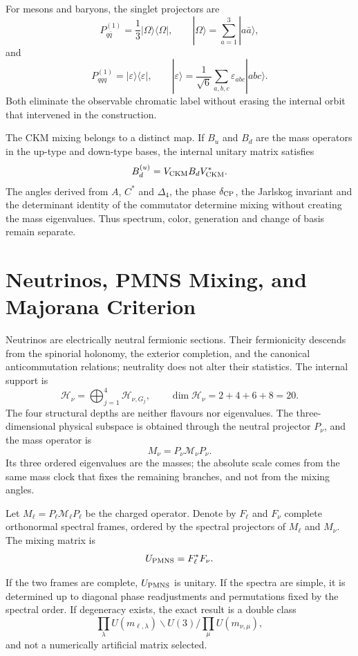 For mesons and baryons, the singlet projectors are
\[
 P_{q\bar q}^{(1)}
 =\frac1{3}|\Omega\rangle\langle\Omega|,
 \qquad
 |\Omega\rangle=\sum_{a=1}^{3}|a\bar a\rangle,
\]
and
\[
 P_{qqq}^{(1)}
 =|\varepsilon\rangle\langle\varepsilon|,
 \qquad
 |\varepsilon\rangle
 =\frac1{\sqrt6}\sum_{a,b,c}\varepsilon_{abc}|abc\rangle.
\]
Both eliminate the observable chromatic label without erasing the internal orbit
that intervened in the construction.

The CKM mixing belongs to a distinct map. If \(B_u\) and \(B_d\) are the
mass operators in the up-type and down-type bases, the internal unitary matrix
satisfies
\[
 B_d^{(u)}=V_{\rm CKM} B_d V_{\rm CKM}^*.
\]
The angles derived from \(A\), \(C^*\) and \(\Delta_4\), the phase
\(\delta_{\rm CP}\), the Jarlskog invariant and the determinant identity
of the commutator determine mixing without creating the mass eigenvalues. Thus
spectrum, color, generation and change of basis remain separate.

\section{Neutrinos, PMNS Mixing, and Majorana Criterion}

Neutrinos are electrically neutral fermionic sections. Their
fermionicity descends from the spinorial holonomy, the exterior completion, and
the canonical anticommutation relations; neutrality does not alter their
statistics. The internal support is
\[
 \mathcal H_\nu=
 \bigoplus_{j=1}^{4}\mathcal H_{\nu,G_j},
 \qquad
 \dim\mathcal H_\nu=2+4+6+8=20.
\]
The four structural depths are neither flavours nor eigenvalues. The
three-dimensional physical subspace is obtained through the neutral projector
\(P_\nu\), and the mass operator is
\[
 M_\nu=P_\nu\mathcal M_\nu P_\nu.
\]
Its three ordered eigenvalues are the masses; the absolute scale comes from the
same mass clock that fixes the remaining branches, and not from the mixing angles.

Let \(M_\ell=P_\ell\mathcal M_\ell P_\ell\) be the charged operator. Denote by
\(F_\ell\) and \(F_\nu\) complete orthonormal spectral frames, ordered by
the spectral projectors of \(M_\ell\) and \(M_\nu\). The mixing matrix is
\[
 U_{\rm PMNS}=F_\ell^*F_\nu.
\]

\begin{theorem}
If the two frames are complete, \(U_{\rm PMNS}\) is unitary. If the
spectra are simple, it is determined up to diagonal phase readjustments and
permutations fixed by the spectral order. If degeneracy exists, the
exact result is a double class
\[
 \prod_\lambda U(m_{\ell,\lambda})
 \backslash U(3) /
 \prod_\mu U(m_{\nu,\mu}),
\]
and not a numerically artificial matrix selected.
\end{theorem}

